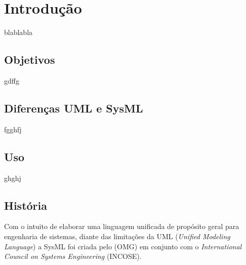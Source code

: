 \chapter{Introdução}\label{CAP:introducao}





blablabla

\section{Objetivos}
gdffg
 
\section{Diferenças UML e SysML}
fgghfj

\section{Uso}
ghghj

\section{História}

Com o intuito de elaborar uma linguagem unificada de propósito geral para engenharia de sistemas, diante das limitações da UML (\textit{Unified Modeling Language}) a SysML foi criada pelo  (OMG) em conjunto com o \textit{International Council on Systems Engineering} (INCOSE). 

